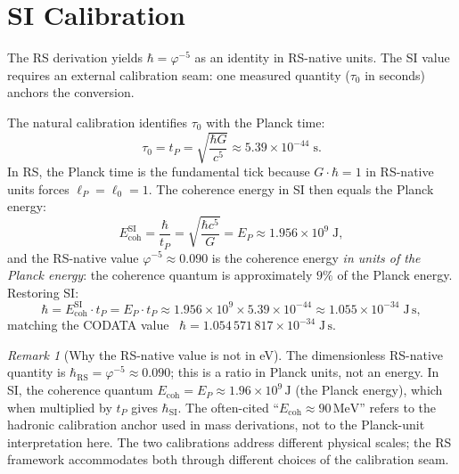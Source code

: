 \documentclass[12pt,a4paper]{article}
\theoremstyle{definition}
\theoremstyle{remark}
\newtheorem{remark}[theorem]{Remark}
\begin{document}
\section{SI Calibration}
\label{sec:si}

The RS derivation yields $\hbar = \varphi^{-5}$ as an identity
in RS-native units.  The SI value requires an external
calibration seam: one measured quantity ($\tau_0$ in seconds)
anchors the conversion.

The natural calibration identifies $\tau_0$ with the Planck time:
\begin{equation}
  \tau_0 = t_P = \sqrt{\frac{\hbar G}{c^5}}
  \approx 5.39 \times 10^{-44}\;\mathrm{s}.
\end{equation}
In RS, the Planck time is the fundamental tick because
$G \cdot \hbar = 1$ in RS-native units forces $\ell_P = \ell_0 = 1$.
The coherence energy in SI then equals the Planck energy:
\begin{equation}
  E_{\mathrm{coh}}^{\mathrm{SI}} = \frac{\hbar}{t_P}
  = \sqrt{\frac{\hbar c^5}{G}}
  = E_P \approx 1.956 \times 10^{9}\;\mathrm{J},
\end{equation}
and the RS-native value $\varphi^{-5} \approx 0.090$ is the
coherence energy \emph{in units of the Planck energy}: the
coherence quantum is approximately $9\%$ of the Planck energy.
Restoring SI:
\begin{equation}
  \hbar = E_{\mathrm{coh}}^{\mathrm{SI}} \cdot t_P
  = E_P \cdot t_P
  \approx 1.956 \times 10^{9} \times 5.39 \times 10^{-44}
  \approx 1.055 \times 10^{-34}\;\mathrm{J\,s},
\end{equation}
matching the CODATA value~\cite{CODATA2024}
$\hbar = 1.054\,571\,817 \times 10^{-34}\;\mathrm{J\,s}$.

\begin{remark}[Why the RS-native value is not in eV]
The dimensionless RS-native quantity is
$\hbar_{\mathrm{RS}} = \varphi^{-5} \approx 0.090$; this is
a ratio in Planck units, not an energy.  In SI, the coherence
quantum $E_{\mathrm{coh}} = E_P \approx 1.96\times10^9\,\mathrm{J}$
(the Planck energy), which when multiplied by $t_P$ gives
$\hbar_{\mathrm{SI}}$.  The often-cited ``$E_{\mathrm{coh}}
\approx 90\,\mathrm{MeV}$'' refers to the hadronic calibration
anchor used in mass derivations, not to the Planck-unit
interpretation here.  The two calibrations address different
physical scales; the RS framework accommodates both through
different choices of the calibration seam.
\end{remark}
\end{document}
